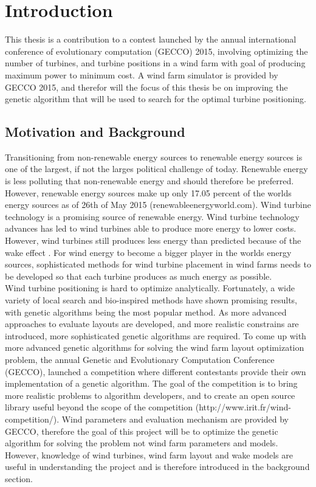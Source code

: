 \chapter{Introduction}
This thesis is a contribution to a contest launched by the annual international conference of evolutionary computation (GECCO) 2015, involving optimizing the number of turbines, and turbine positions in a wind farm with goal of producing maximum power to minimum cost. A wind farm simulator is provided by GECCO 2015, and therefor will the focus of this thesis be on improving the genetic algorithm that will be used to search for the optimal turbine positioning.


\section{Motivation and Background}
Transitioning from non-renewable energy sources to renewable energy sources is one of the largest, if not the larges political challenge of today. Renewable energy is less polluting that non-renewable energy and should therefore be preferred. However, renewable energy sources make up only 17.05 percent of the worlds energy sources as of 26th of May 2015 (renewableenergyworld.com). Wind turbine technology is a promising source of renewable energy. Wind turbine technology advances has led to wind turbines able to produce more energy to lower costs. However, wind turbines still produces less energy than predicted because of the wake effect \citep{Samorani}. For wind energy to become a bigger player in the worlds energy sources, sophisticated methods for wind turbine placement in wind farms needs to be developed so that each turbine produces as much energy as possible. \\

\noindent Wind turbine positioning is hard to optimize analytically. Fortunately, a wide variety of local search and bio-inspired methods have shown promising results, with genetic algorithms being the most popular method. As more advanced approaches to evaluate layouts are developed, and more realistic constrains are introduced, more sophisticated genetic algorithms are required. To come up with more advanced genetic algorithms for solving the wind farm layout optimization problem, the annual Genetic and Evolutionary Computation Conference (GECCO), launched a competition where different contestants provide their own implementation of a genetic algorithm. The goal of the competition is to bring more realistic problems to algorithm developers, and to create an open source library useful beyond the scope of the competition (http://www.irit.fr/wind-competition/). Wind parameters and evaluation mechanism are provided by GECCO, therefore the goal of this project will be to optimize the genetic algorithm for solving the problem not wind farm parameters and models. However, knowledge of wind turbines, wind farm layout and wake models are useful in understanding the project and is therefore introduced in the background section. \\

